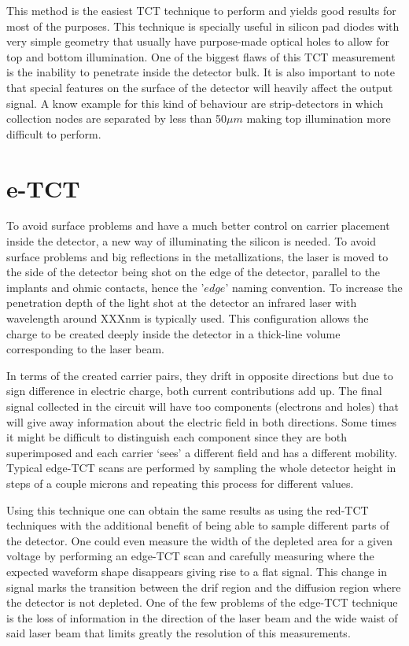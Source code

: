 This method is the easiest TCT technique to perform and yields good results for most of the purposes. This technique is specially useful in silicon pad diodes with very simple geometry that usually have purpose-made optical holes to allow for top and bottom illumination. One of the biggest flaws of this TCT measurement is the inability to penetrate inside the detector bulk. It is also important to note that special features on the surface of the detector will heavily affect the output signal. A know example for this kind of behaviour are strip-detectors in which collection nodes are separated by less than 50$\mu m$ making top illumination more difficult to perform.

\section{e-TCT} %

To avoid surface problems and have a much better control on carrier placement inside the detector, a new way of illuminating the silicon is needed. To avoid surface problems and big reflections in the metallizations, the laser is moved to the side of the detector being shot on the edge of the detector, parallel to the implants and ohmic contacts, hence the '$edge$' naming convention. To increase the penetration depth of the light shot at the detector an infrared laser with wavelength around XXXnm is typically used. This configuration allows the charge to be created deeply inside the detector in a thick-line volume corresponding to the laser beam.

In terms of the created carrier pairs, they drift in opposite directions but due to sign difference in electric charge, both current contributions add up. The final signal collected in the circuit will have too components (electrons and holes) that will give away information about the electric field in both directions. Some times it might be difficult to distinguish each component since they are both superimposed and each carrier `sees' a different field and has a different mobility. Typical edge-TCT scans are performed by sampling the whole detector height in steps of a couple microns and repeating this process for different \vias values.

Using this technique one can obtain the same results as using the red-TCT techniques with the additional benefit of being able to sample different parts of the detector. One could even measure the width of the depleted area for a given voltage by performing an edge-TCT scan and carefully measuring where the expected waveform shape disappears giving rise to a flat signal. This change in signal marks the transition between the drif region and the diffusion region where the detector is not depleted. One of the few problems of the edge-TCT technique is the loss of information in the direction of the laser beam and the wide waist of said laser beam that limits greatly the resolution of this measurements.

